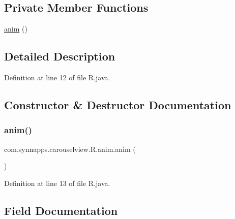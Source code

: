 \subsection*{Private Member Functions}
\begin{DoxyCompactItemize}
\item 
\mbox{\hyperlink{classcom_1_1synnapps_1_1carouselview_1_1_r_1_1anim_add40a62cec7666465f3ff1aa36a836f4}{anim}} ()
\end{DoxyCompactItemize}


\subsection{Detailed Description}


Definition at line 12 of file R.\+java.



\subsection{Constructor \& Destructor Documentation}
\mbox{\label{classcom_1_1synnapps_1_1carouselview_1_1_r_1_1anim_add40a62cec7666465f3ff1aa36a836f4}} 
\subsubsection{\texorpdfstring{anim()}{anim()}}
{\footnotesize\ttfamily com.\+synnapps.\+carouselview.\+R.\+anim.\+anim (\begin{DoxyParamCaption}{ }\end{DoxyParamCaption})\hspace{0.3cm}{\ttfamily [private]}}



Definition at line 13 of file R.\+java.


\begin{DoxyCode}{0}

\end{DoxyCode}


\subsection{Field Documentation}
\mbox{\label{classcom_1_1synnapps_1_1carouselview_1_1_r_1_1anim_a5bbdf51a26336e553745a3b69c5458f8}} 
